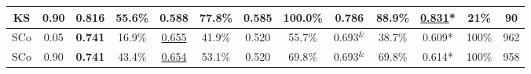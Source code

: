 \begin{table}[!t]
\begin{tabular}{|c|c||c|c||c|c||c|c||c|c||c|c|@{ }c@{ }|}
KS& 0.90
& 0.816 & 55.6\%
&0.588 & 77.8\%
& 0.585	&100.0\%
& 0.786	&88.9\%
&\underline{0.831}* &21\%
& 90
\\ \hline
\hline
\hline

SCo & 0.05
& \bf{0.741} & 16.9\%
&\underline{0.655} &41.9\%
& 0.520	&55.7\%
& 0.693$^{\&}$	&38.7\%
&0.609* & 100\%
& 962
\\
\hline
SCo& 0.90
& {\bf 0.741} & 43.4\%
&\underline{0.654} & 53.1\%
&0.520	&69.8\%
& 0.693$^{\&}$ &69.8\%
&0.614* &100\%
& 958
\\
\hline

\end{tabular}
\end{table}



